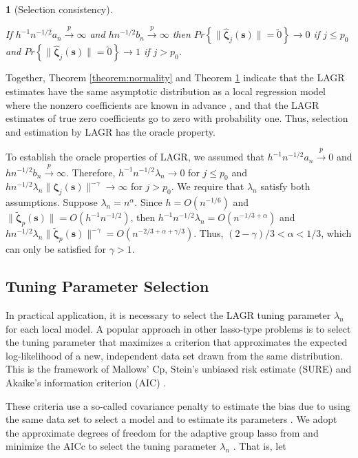 \documentclass[english]{article}\usepackage[]{graphicx}\usepackage[]{color}
\theoremstyle{plain}
\newtheorem{thm}{\protect\theoremname}
\theoremstyle{plain}
\providecommand{\theoremname}{Theorem}
\begin{document}
\begin{thm}[Selection consistency]
\label{theorem:selection}



If $h^{-1}n^{-1/2}a_{n}\xrightarrow{p}\infty$ and $hn^{-1/2}b_{n}\xrightarrow{p}\infty$
then $Pr\left\{ \|\hat{\bm{\zeta}}_{j}\left(\bm{s}\right)\|=\utilde{0}\right\} \to0$
if $j\le p_{0}$ and $Pr\left\{ \|\hat{\bm{\zeta}}_{j}\left(\bm{s}\right)\|=\utilde{0}\right\} \to1$
if $j>p_{0}$. 
\end{thm}
Together, Theorem \ref{theorem:normality} and Theorem \ref{theorem:selection}
indicate that the LAGR estimates have the same asymptotic distribution
as a local regression model where the nonzero coefficients are known
in advance \citep{Sun-Yan-Zhang-Lu-2014}, and that the LAGR estimates
of true zero coefficients go to zero with probability one. Thus, selection
and estimation by LAGR has the oracle property.

To establish the oracle properties of LAGR, we assumed that $h^{-1}n^{-1/2}a_{n}\xrightarrow{p}0$
and $hn^{-1/2}b_{n}\xrightarrow{p}\infty$. Therefore, $h^{-1}n^{-1/2}\lambda_{n}\to0$
for $j\le p_{0}$ and $hn^{-1/2}\lambda_{n}\|\bm{\zeta}_{j}\left(\bm{s}\right)\|^{-\gamma}\to\infty$
for $j>p_{0}$. We require that $\lambda_{n}$ satisfy both assumptions.
Suppose $\lambda_{n}=n^{\alpha}$. Since $h=O\left(n^{-1/6}\right)$
and $\|\tilde{\bm{\zeta}}_{p}(\bm{s})\|=O\left(h^{-1}n^{-1/2}\right)$,
then $h^{-1}n^{-1/2}\lambda_{n}=O\left(n^{-1/3+\alpha}\right)$ and
$hn^{-1/2}\lambda_{n}\|\tilde{\bm{\zeta}}_{p}\left(\bm{s}\right)\|^{-\gamma}=O\left(n^{-2/3+\alpha+\gamma/3}\right)$.
Thus, $\left(2-\gamma\right)/3<\alpha<1/3$, which can only be satisfied
for $\gamma>1$.


\subsection{Tuning Parameter Selection}

In practical application, it is necessary to select the LAGR tuning
parameter $\lambda_{n}$ for each local model. A popular approach
in other lasso-type problems is to select the tuning parameter that
maximizes a criterion that approximates the expected log-likelihood
of a new, independent data set drawn from the same distribution. This
is the framework of Mallows' Cp, Stein's unbiased risk estimate (SURE)
and Akaike's information criterion (AIC) \citep{Mallows-1973,Stein-1981,Akaike-1973}.

These criteria use a so-called covariance penalty to estimate the
bias due to using the same data set to select a model and to estimate
its parameters \citep{Efron:2004a}. We adopt the approximate degrees
of freedom for the adaptive group lasso from \citet{Yuan-Lin-2006}
and minimize the AICc to select the tuning parameter $\lambda_{n}$
\citep{Hurvich-1998}. That is, let
\end{document}
